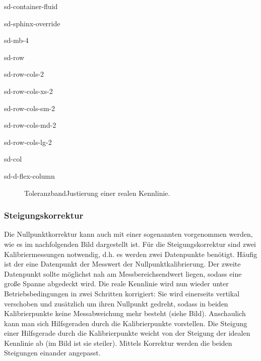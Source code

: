 \documentclass[letterpaper,10pt,english]{jupyterBook}
\let\sphinxpxdimen\pdfpxdimen\else\newdimen\sphinxpxdimen
\begin{document}
\begin{sphinxuseclass}{sd-container-fluid}
\begin{sphinxuseclass}{sd-sphinx-override}
\begin{sphinxuseclass}{sd-mb-4}
\begin{sphinxuseclass}{sd-row}
\begin{sphinxuseclass}{sd-row-cols-2}
\begin{sphinxuseclass}{sd-row-cols-xs-2}
\begin{sphinxuseclass}{sd-row-cols-sm-2}
\begin{sphinxuseclass}{sd-row-cols-md-2}
\begin{sphinxuseclass}{sd-row-cols-lg-2}
\begin{sphinxuseclass}{sd-col}
\begin{sphinxuseclass}{sd-d-flex-column}
\begin{figure}[htbp]
\noindent\sphinxincludegraphics[width=300\sphinxpxdimen]{{reale_KL_toleranzbandkorr}.jpg}
\caption{Toleranzband\sphinxhyphen{}Justierung einer realen Kennlinie.}\label{\detokenize{content/2_realeKennlinie:reale-kl-toleranzbandkorr}}\end{figure}

\end{sphinxuseclass}
\end{sphinxuseclass}
\end{sphinxuseclass}
\end{sphinxuseclass}
\end{sphinxuseclass}
\end{sphinxuseclass}
\end{sphinxuseclass}
\end{sphinxuseclass}
\end{sphinxuseclass}
\end{sphinxuseclass}
\end{sphinxuseclass}

\subsubsection{Steigungskorrektur}
\label{\detokenize{content/2_realeKennlinie:steigungskorrektur}}
\sphinxAtStartPar
Die Nullpunktkorrektur kann auch mit einer sogenannten  vorgenommen werden, wie es im nachfolgenden Bild dargestellt ist. Für die Steigungskorrektur sind zwei Kalibriermessungen notwendig, d.h. es werden zwei Datenpunkte benötigt. Häufig ist der eine Datenpunkt der Messwert der Nullpunktkalibrierung. Der zweite Datenpunkt sollte möglichst nah am Messbereichsendwert liegen, sodass eine große Spanne abgedeckt wird. Die reale Kennlinie wird nun wieder unter Betriebsbedingungen in zwei Schritten korrigiert: Sie wird einerseits vertikal verschoben und zusätzlich um ihren Nullpunkt gedreht, sodass in beiden Kalibrierpunkte keine Messabweichung mehr besteht (siehe Bild).
Anschaulich kann man sich Hilfsgeraden durch die Kalibrierpunkte vorstellen. Die Steigung einer Hilfsgerade durch die Kalibrierpunkte weicht von der Steigung der idealen Kennlinie ab (im Bild ist sie steiler). Mittels Korrektur werden die beiden Steigungen einander angepasst.
\end{document}
